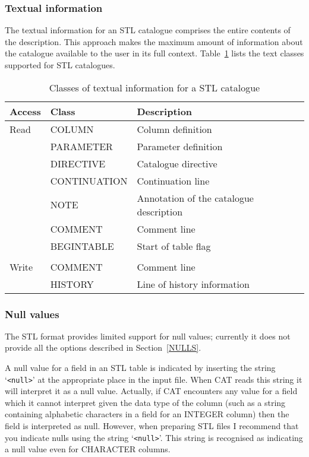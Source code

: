 \subsubsection{Textual information}

The textual information for an STL catalogue comprises the entire contents
of the description. This approach makes the maximum amount of information
about the catalogue available to the user in its full context.
Table~\ref{STL_TEXT} lists the text classes supported for STL catalogues.

\begin{table}[htbp]

\begin{center}
\begin{tabular}{lll}
Access & Class        & Description   \\ \hline
Read   & COLUMN       & Column definition \\
       & PARAMETER    & Parameter definition \\
       & DIRECTIVE    & Catalogue directive \\
       & CONTINUATION & Continuation line \\
       & NOTE         & Annotation of the catalogue description \\
       & COMMENT      & Comment line  \\
       & BEGINTABLE   & Start of table flag \\
       &              & \\
Write  & COMMENT      & Comment line  \\
       & HISTORY      & Line of history information \\
\end{tabular}
\end{center}

\caption{\label{STL_TEXT}Classes of textual information for a STL
catalogue}

\end{table}

\subsubsection{Null values}

The STL format provides limited support for null values; currently it
does not provide all the options described in Section~\ref{NULLS}.

A null value for a field in an STL table is indicated by inserting
the string `\verb-<null>-' at the appropriate place in the input file.
When CAT reads this string it will interpret it as a null value.
Actually, if CAT encounters any value for a field which it cannot
interpret given the data type of the column (such as a string containing
alphabetic characters in a field for an INTEGER column) then the field
is interpreted as null.  However, when preparing STL files I recommend
that you indicate nulls using the string `\verb-<null>-'.  This string
is recognised as indicating a null value even for CHARACTER columns.

